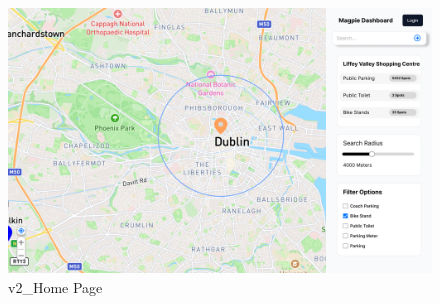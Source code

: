 \begin{figure}[h]
    \centering
    \begin{minipage}{0.48\textwidth}
        \centering
        \includegraphics[width=\textwidth]{images/v2_Home Page.png}
        \caption{v2\_Home Page}
        \label{fig:v2_Home Page}
    \end{minipage}
\end{figure}


